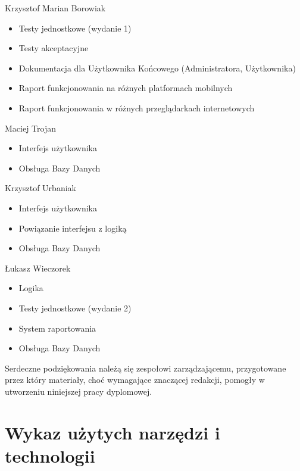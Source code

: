 \begin{description}
\item Krzysztof Marian Borowiak

\begin{itemize}
\item Testy jednostkowe (wydanie 1)
\item Testy akceptacyjne
\item Dokumentacja dla Użytkownika Końcowego (Administratora, Użytkownika)
\item Raport funkcjonowania na różnych platformach mobilnych
\item Raport funkcjonowania w różnych przeglądarkach internetowych
\end{itemize}
\noindent

\item Maciej Trojan

\begin{itemize}
\item Interfejs użytkownika
\item Obsługa Bazy Danych
\end{itemize}
\noindent

\item Krzysztof Urbaniak

\begin{itemize}
\item Interfejs użytkownika
\item Powiązanie interfejsu z logiką
\item Obsługa Bazy Danych
\end{itemize}
\noindent

\item Łukasz Wieczorek

\begin{itemize}
\item Logika
\item Testy jednostkowe (wydanie 2)
\item System raportowania
\item Obsługa Bazy Danych
\end{itemize}
\noindent

\end{description}

Serdeczne podziękowania należą się zespołowi zarządzającemu, przygotowane przez który materiały, choć wymagające znaczącej redakcji, pomogły w utworzeniu niniejszej pracy dyplomowej.

\section{Wykaz użytych narzędzi i technologii}
\label{ChapterA4}


